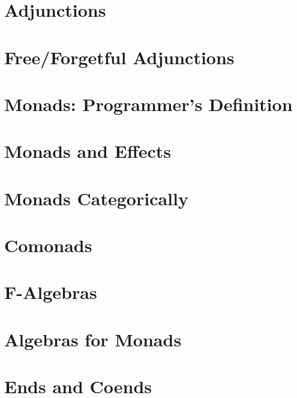 \chapter{Adjunctions}\label{adjunctions}


\chapter{Free/Forgetful Adjunctions}\label{free-forgetful-adjunctions}


\chapter{Monads: Programmer's Definition}\label{monads-programmers-definition}


\chapter{Monads and Effects}\label{monads-and-effects}


\chapter{Monads Categorically}\label{monads-categorically}


\chapter{Comonads}\label{comonads}


\chapter{F-Algebras}\label{f-algebras}


\chapter{Algebras for Monads}\label{algebras-for-monads}


\chapter{Ends and Coends}\label{ends-and-coends}


